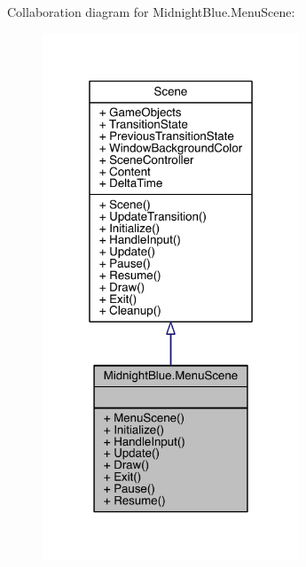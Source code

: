 Collaboration diagram for Midnight\+Blue.\+Menu\+Scene\+:\nopagebreak
\begin{figure}[H]
\begin{center}
\leavevmode
\includegraphics[width=217pt]{class_midnight_blue_1_1_menu_scene__coll__graph}
\end{center}
\end{figure}
